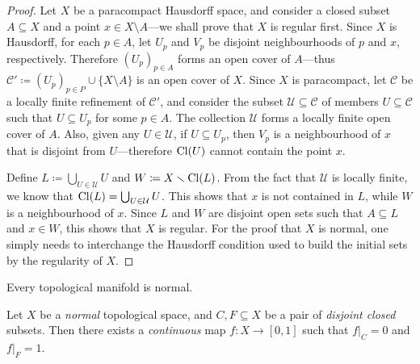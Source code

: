 \begin{proof}
Let \(X\) be a paracompact Hausdorff space, and consider a closed subset
\(A \subseteq X\) and a point \(x \in X \setminus A\)---we shall prove that
\(X\) is regular first. Since \(X\) is Hausdorff, for each \(p \in A\), let
\(U_p\) and \(V_p\) be disjoint neighbourhoods of \(p\) and \(x\),
respectively. Therefore \((U_p)_{p \in A}\) forms an open cover of \(A\)---thus
\(\mathcal{C}' \coloneq (U_p)_{p \in P} \cup \{X \setminus A\}\) is an open
cover of \(X\). Since \(X\) is paracompact, let \(\mathcal{C}\) be a locally
finite refinement of \(\mathcal{C}'\), and consider the subset
\(\mathcal{U} \subseteq \mathcal{C}\) of members \(U \subseteq \mathcal{C}\)
such that \(U \subseteq U_p\) for some \(p \in A\). The collection
\(\mathcal{U}\) forms a locally finite open cover of \(A\). Also, given any \(U
\in \mathcal{U}\), if \(U \subseteq U_p\), then \(V_p\) is a neighbourhood of
\(x\) that is disjoint from \(U\)---therefore \(\operatorname{Cl}(U)\) cannot contain the
point \(x\).

Define \(L \coloneq \bigcup_{U \in \mathcal{U}} U\) and \(W \coloneq X \smallsetminus
\operatorname{Cl}(L)\). From the fact that \(\mathcal{U}\) is locally finite, we know that
\(\operatorname{Cl}(L) = \bigcup_{U \in \mathcal{U}} U\). This shows that \(x\) is not
contained in \(L\), while \(W\) is a neighbourhood of \(x\). Since \(L\) and
\(W\) are disjoint open sets such that \(A \subseteq L\) and \(x \in W\), this
shows that \(X\) is regular. For the proof that \(X\) is normal, one simply
needs to interchange the Hausdorff condition used to build the initial sets by
the regularity of \(X\).
\end{proof}

\begin{corollary}
\label{cor:manifold-is-normal}
Every topological manifold is normal.
\end{corollary}

\begin{theorem}[Urysohn]
\label{thm:urysohn}
Let \(X\) be a \emph{normal} topological space, and \(C, F \subseteq X\) be a
pair of \emph{disjoint closed} subsets. Then there exists a \emph{continuous}
map \(f: X \to [0, 1]\) such that \(f|_C = 0\) and \(f|_F = 1\).
\end{theorem}

